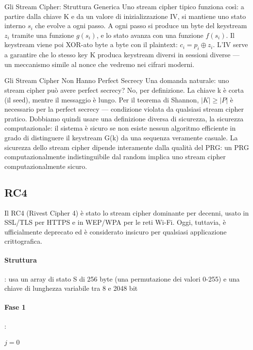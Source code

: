 Gli Stream Cipher: Struttura Generica
Uno stream cipher tipico funziona così: a partire dalla chiave K e da un valore di inizializzazione IV, si mantiene uno stato interno $ s_i $ che evolve a ogni passo. A ogni passo si produce un byte del keystream $ z_i $ tramite una funzione $g(s_i)$, e lo stato avanza con una funzione $ f(s_i) $.
Il keystream viene poi XOR-ato byte a byte con il plaintext: $ c_i = p_i \oplus z_i $.
L'IV serve a garantire che lo stesso key K produca keystream diversi in sessioni diverse — un meccanismo simile al nonce che vedremo nei cifrari moderni.

Gli Stream Cipher Non Hanno Perfect Secrecy
Una domanda naturale: uno stream cipher può avere perfect secrecy?
No, per definizione. La chiave k è corta (il seed), mentre il messaggio è lungo. Per il teorema di Shannon, $ |K| \geq |P| $ è necessario per la perfect secrecy — condizione violata da qualsiasi stream cipher pratico.
Dobbiamo quindi usare una definizione diversa di sicurezza, la sicurezza computazionale: il sistema è sicuro se non esiste nessun algoritmo efficiente in grado di distinguere il keystream G(k) da una sequenza veramente casuale. La sicurezza dello stream cipher dipende interamente dalla qualità del PRG: un PRG computazionalmente indistinguibile dal random implica uno stream cipher computazionalmente sicuro.


\subsection{RC4}

Il RC4 (Rivest Cipher 4) è stato lo stream cipher dominante per decenni, usato in SSL/TLS per HTTPS e in WEP/WPA per le reti Wi-Fi. Oggi, tuttavia, è ufficialmente deprecato ed è considerato insicuro per qualsiasi applicazione crittografica. 
\paragraph{Struttura}: usa un array di stato S di 256 byte (una permutazione dei valori 0-255) e una chiave di lunghezza variabile tra 8 e 2048 bit

\paragraph{Fase 1}:
\begin{algorithm}
\caption{Inizializzazione di S}
$j = 0$\;
\end{algorithm}


